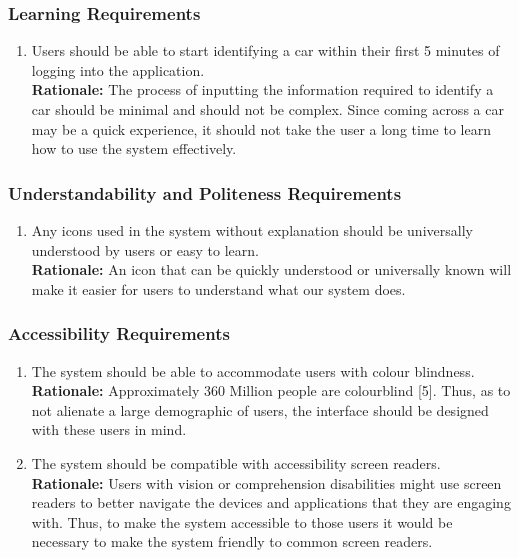 \documentclass[]{article}
\begin{document}

\subsubsection{Learning Requirements}
\label{ssub:learning_requirements}
\begin{enumerate}[label={UH-L\arabic*.}]
	\item Users should be able to start identifying a car within their first 5 minutes of logging into the application.\\
	\textbf{Rationale:} The process of inputting the information required to identify a car should be minimal and should not be complex. Since coming across a car may be a quick experience, it should not take the user a long time to learn how to use the system effectively.
\end{enumerate}

\subsubsection{Understandability and Politeness Requirements}
\label{ssub:understandability_and_politeness_requirements}
\begin{enumerate}[label={UH-UP\arabic*.}]
	\item Any icons used in the system without explanation should be universally understood by users or easy to learn.\\
	\textbf{Rationale:} An icon that can be quickly understood or universally known will make it easier for users to understand what our system does.
\end{enumerate}

\subsubsection{Accessibility Requirements}
\label{ssub:accessibility_requirements}
\begin{enumerate}[label={UH-A\arabic*.}]
	\item The system should be able to accommodate users with colour blindness.\\
	\textbf{Rationale:} Approximately 360 Million people are colourblind [5]. Thus, as to not alienate a large demographic of users, the interface should be designed with these users in mind.
	\item The system should be compatible with accessibility screen readers.\\
	\textbf{Rationale:} Users with vision or comprehension disabilities might use screen readers to better navigate the devices and applications that they are engaging with. Thus, to make the system accessible to those users it would be necessary to make the system friendly to common screen readers.
\end{enumerate}
\end{document}

